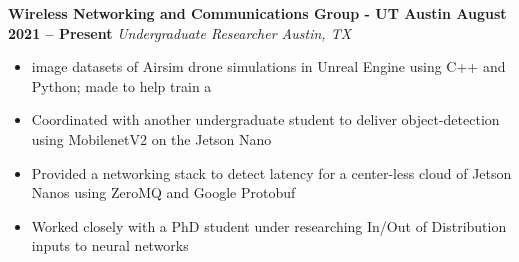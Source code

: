 \documentclass[../main.tex]{subfiles}
\begin{document}
%
\noindent\textbf{{\fontsize{\textFontSize}{\textFontBox}\selectfont Wireless Networking and Communications Group - UT Austin \hfill August 2021 – Present}}
\vspace{\jobHeaderDist}\newline
%
{\fontsize{\textFontSize}{\textFontBox}\selectfont\emph{Undergraduate Researcher \hfill Austin, TX \hspace{0 cm}}}\vspace{\listHeight}\newline
%
%
%
%
%
\begin{itemize}
  \setlength{\itemindent}{-6mm}
  \vspace{\listItemDistTwo}\item {\fontsize{\textFontSize}{\textFontBox} image datasets of Airsim drone simulations in Unreal Engine using C++ and Python; made to help train a }
  \vspace{\listItemDistTwo}\item {\fontsize{\textFontSize}{\textFontBox}\selectfont Coordinated with another undergraduate student to deliver object-detection using MobilenetV2 on the Jetson Nano }
  \vspace{\listItemDistTwo}\item {\fontsize{\textFontSize}{\textFontBox}\selectfont Provided a networking stack to detect latency for a center-less cloud of Jetson Nanos using ZeroMQ and Google Protobuf }
  \vspace{-9mm}\item {\fontsize{\textFontSize}{\textFontBox}\selectfont Worked closely with a PhD student under researching In/Out of Distribution inputs to neural networks }
\end{itemize}
%
%
\end{document}

